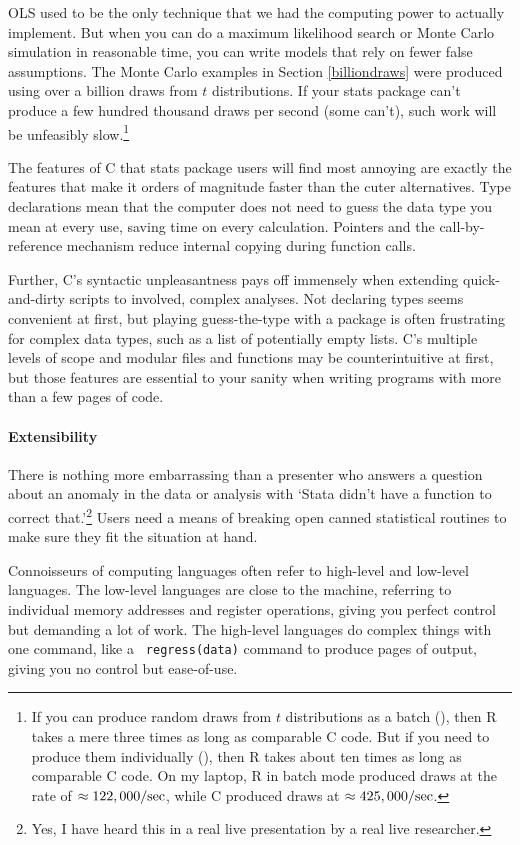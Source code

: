 OLS used to be the only technique that we had the computing power to
actually implement. But when you can do a maximum likelihood search
or Monte Carlo simulation in reasonable time, you can write models
that rely on fewer false assumptions. The Monte Carlo examples in Section
\ref{billiondraws} were produced using over a billion draws from $t$
distributions. If your stats package can't produce a few hundred thousand 
draws per second (some can't), such work will be unfeasibly
slow.\footnote{If you can produce random draws from $t$ distributions
as a batch (), then R takes a mere three
times as long as comparable C code. But if you need to produce them
individually (), then R 
takes about ten times as long as comparable C code. On my laptop, R in
batch mode produced draws at the rate of $\approx 122,000/{\rm sec}$,
while C produced draws at $\approx 425,000/{\rm sec}$.}

The features of C that stats package users will find most annoying are
exactly the features that make it orders of magnitude faster than the cuter
alternatives.  Type declarations mean that the computer does not need
to guess the data type you mean at every use, saving time on
every calculation.  Pointers and the call-by-reference mechanism reduce
internal copying during function calls.

Further, C's syntactic unpleasantness pays off immensely when extending
quick-and-dirty scripts to involved, complex analyses.
Not declaring types seems convenient at first, but playing guess-the-type
with a package is often frustrating for complex data types, such
as a list of potentially empty lists. C's multiple levels of scope and 
modular files and functions may be counterintuitive at first,
but those features are essential to your sanity when
writing programs with more than a few pages of code.

\paragraph{Extensibility}
There is nothing more embarrassing than a presenter who answers a question
about an anomaly in the data or analysis with `Stata didn't have a function to
correct that.'\footnote{Yes, I have heard this in a real live presentation
by a real live researcher.} Users need a means of breaking open canned
statistical routines to make sure they fit the situation at hand.

Connoisseurs of computing languages often refer to high-level and
low-level languages. The low-level languages are close to the machine,
referring to individual memory addresses and register operations,
giving you perfect control but demanding a lot of work. The high-level
languages do complex things with one command, like a {\tt
regress(data)} command to produce pages of output, giving you no control
but ease-of-use.

